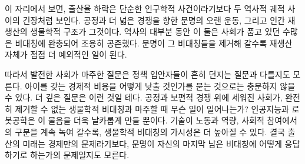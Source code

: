 \documentclass[12pt]{article}
\begin{document}
이 자리에서 보면, 출산율 하락은 단순한 인구학적 사건이라기보다 두 역사적 궤적 사이의 긴장처럼 보인다. 공정과 더 넓은 경쟁을 향한 문명의 오랜 운동, 그리고 인간 재생산의 생물학적 구조가 그것이다. 역사의 대부분 동안 이 둘은 사회가 품고 있던 수많은 비대칭에 완충되어 조용히 공존했다. 문명이 그 비대칭들을 제거해 갈수록 재생산 자체가 점점 더 예외적인 일이 된다.

따라서 발전한 사회가 마주한 질문은 정책 입안자들이 흔히 던지는 질문과 다를지도 모른다. 아이를 갖는 경제적 비용을 어떻게 낮출 것인가를 묻는 것으로는 충분하지 않을 수 있다. 더 깊은 질문은 이런 것일 테다. 공정과 보편적 경쟁 위에 세워진 사회가, 완전히 제거할 수 없는 생물학적 비대칭과 마주할 때 무슨 일이 일어나는가? 인공지능과 로봇공학은 이 물음을 더욱 날카롭게 만들 뿐이다. 기술이 노동과 역량, 사회적 참여에서의 구분을 계속 녹여 갈수록, 생물학적 비대칭의 가시성은 더 높아질 수 있다. 결국 출산의 미래는 경제만의 문제라기보다, 문명이 자신의 마지막 남은 비대칭에 어떻게 응답하기로 하는가의 문제일지도 모른다.
\end{document}
